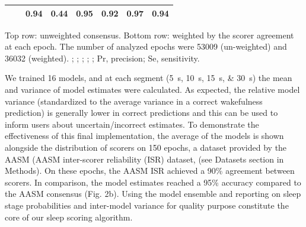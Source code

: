\begin{table}
\begin{threeparttable}
\begin{tabular}{@{}llSSSSSS@{}}
        &        & 0.94    & 0.44   & 0.95    & 0.92   & 0.97    & 0.94                 \\ \bottomrule
    \end{tabular}
    \begin{tablenotes}
    \small \item Top row: unweighted consensus. Bottom row: weighted by the scorer agreement at each epoch. The number of analyzed epochs were \num{53009} (un-weighted) and \num{36032} (weighted). %
    ; %
    ; %
    ; %
    ; %
    ; %
    Pr, precision; Se, sensitivity.
    \end{tablenotes}
\end{threeparttable}
\end{table}

We trained 16 models, and at each segment (\SIlist{5;10;15;30}{\second}) the mean and variance of model estimates were calculated. 
As expected, the relative model variance (standardized to the average variance in a correct wakefulness prediction) is generally lower in correct predictions and this can be used to inform users about uncertain/incorrect estimates. 
To demonstrate the effectiveness of this final implementation, the average of the models is shown alongside the distribution of  scorers on 150 epochs, a dataset provided by the AASM (AASM inter-scorer reliability (ISR) dataset, (see Datasets section in Methods). 
On these epochs, the AASM ISR achieved a 90\% agreement between scorers. 
In comparison, the model estimates reached a 95\% accuracy compared to the AASM consensus (Fig. 2b). 
Using the model ensemble and reporting on sleep stage probabilities and inter-model variance for quality purpose constitute the core of our sleep scoring algorithm.

